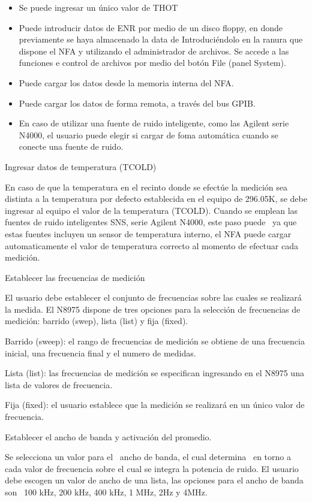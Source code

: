 	\begin{itemize}
		\item Se puede ingresar un único valor de THOT
		\item Puede introducir datos de ENR por medio de un disco floppy, en donde previamente se haya almacenado la data de
		Introduciéndolo en la ranura que dispone el NFA y utilizando el administrador de archivos. Se accede a las funciones e
		control de archivos por medio del botón File (panel System).
		\item Puede cargar los datos desde la memoria interna del NFA. 
		\item Puede cargar los datos de forma remota, a través del bus GPIB. 
		\item En caso de utilizar una fuente de ruido inteligente, como las Agilent serie N4000, el usuario puede elegir si
		cargar de foma automática cuando se conecte una fuente de ruido.
	\end{itemize}
	Ingresar datos de temperatura (TCOLD)
	
	En caso de que la temperatura en el recinto donde se efectúe la medición sea distinta a la temperatura por defecto
	establecida en el equipo de 296.05K, se debe ingresar al equipo el valor de la temperatura (TCOLD). Cuando se emplean
	las fuentes de ruido inteligentes SNS, serie Agilent N4000, este paso puede \ ya que estas fuentes incluyen un sensor
	de temperatura interno, el NFA puede cargar automaticamente el valor de temperatura correcto al momento de efectuar
	cada medición.
	
	Establecer las frecuencias de medición
	
	El usuario debe establecer el conjunto de frecuencias sobre las cuales se realizará la medida. El N8975 dispone de tres
	opciones para la selección de frecuencias de medición: barrido (swep), lista (list) y fija (fixed).
	
	Barrido (sweep): el rango de frecuencias de medición se obtiene de una frecuencia inicial, una frecuencia final y el
	numero de medidas.
	
	Lista (list): las frecuencias de medición se especifican ingresando en el N8975 una lista de valores de frecuencia.
	
	Fija (fixed): el usuario establece que la medición se realizará en un único valor de frecuencia.
	
	Establecer el ancho de banda y activación del promedio.
	
	Se selecciona un valor para el \ ancho de banda, el cual determina \ en torno a cada valor de frecuencia sobre el cual
	se integra la potencia de ruido. El usuario debe escogen un valor de ancho de una lista, las opciones para el ancho de
	banda son \ 100 kHz, 200 kHz, 400 kHz, 1 MHz, 2Hz y 4MHz.
	
